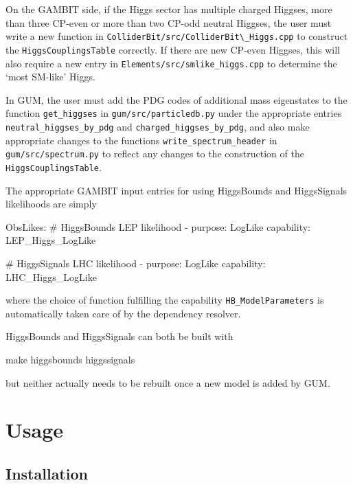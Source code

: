 \documentclass[pdftex,twocolumn,epjc3_preprint,runningheads]{svjour3}
\renewcommand{\_}{\discretionary{\underscore}{}{\underscore}}
\newcommand\cpp[1]{{\lstinline!#1!}}  %
\newcommand\term[1]{{\lstset{style=terminal}\lstinline!#1!\lstset{style=cpp}}}
\newcommand\py[1]{{\lstset{style=python}\lstinline!#1!\lstset{style=cpp}}}
\newcommand\textinline[1]{{{\lstset{style=text}\lstinline!#1!}}}
\newcommand{\gambit}{\textsf{GAMBIT}\xspace}
\newcommand{\GB}{\gambit}
\newcommand{\higgsbounds}{\textsf{HiggsBounds}\xspace}
\newcommand{\higgssignals}{\textsf{HiggsSignals}\xspace}
\newcommand{\gum}{\textsf{GUM}\xspace}
\begin{document}
On the \GB side, if the Higgs sector has multiple charged Higgses, more than three CP-even or more than two CP-odd neutral Higgses, the user must write a new function in \term{ColliderBit/src/ColliderBit\_Higgs.cpp} to construct the \cpp{HiggsCouplingsTable} correctly. If there are new CP-even Higgses, this will also require a new entry in \term{Elements/src/smlike_higgs.cpp} to determine the `most SM-like' Higgs.

In \gum, the user must add the PDG codes of additional mass eigenstates to the function \cpp{get_higgses} in \textinline{gum/src/particledb.py} under the appropriate entries \py{neutral_higgses_by_pdg} and \py{charged_higgses_by_pdg}, and also make appropriate changes to the functions \py{write_spectrum_header} in \textinline{gum/src/spectrum.py} to reflect any changes to the construction of the \cpp{HiggsCouplingsTable}.

The appropriate \gambit input entries for using \higgsbounds and \higgssignals likelihoods are simply
%
\begin{lstyaml}
ObsLikes:
  # HiggsBounds LEP likelihood
  - purpose:      LogLike
    capability:   LEP_Higgs_LogLike

  # HiggsSignals LHC likelihood
  - purpose:      LogLike
    capability:   LHC_Higgs_LogLike
\end{lstyaml}
%
where the choice of function fulfilling the capability \cpp{HB_ModelParameters} is automatically taken care of by the dependency resolver.

\higgsbounds and \higgssignals can both be built with
%
\begin{lstterm}
make higgsbounds higgssignals
\end{lstterm}
%
but neither actually needs to be rebuilt once a new model is added by \gum.

\section{Usage} \label{sec:usage}

\subsection{Installation}\label{sec:build}
\end{document}
